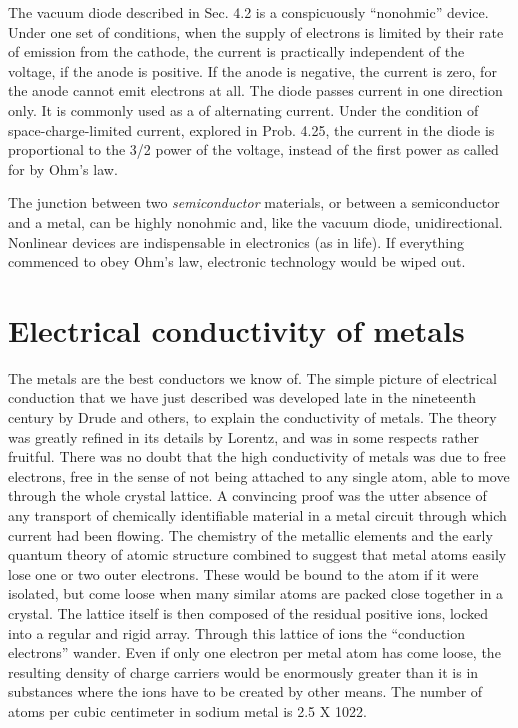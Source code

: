 The vacuum diode described in Sec. 4.2 is a conspicuously ``nonohmic''
device. Under one set of conditions, when the supply of
electrons is limited by their rate of emission from the cathode, the
current is practically independent of the voltage, if the anode is positive.
If the anode is negative, the current is zero, for the anode cannot
emit electrons at all. The diode passes current in one direction
only. It is commonly used as a  of alternating current.
Under the condition of space-charge-limited current, explored in
Prob. 4.25, the current in the diode is proportional to the 3/2 power
of the voltage, instead of the first power as called for by Ohm's law.

The junction between two \emph{semiconductor} materials, or between a
semiconductor and a metal, can be highly nonohmic and, like the
vacuum diode, unidirectional. Nonlinear devices are indispensable
in electronics (as in life). If everything commenced to obey Ohm's
law, electronic technology would be wiped out.

\iffalse

\section{Electrical conductivity of metals}

The metals are the best conductors we know of. The simple picture
of electrical conduction that we have just described was developed
late in the nineteenth century by Drude and others, to explain
the conductivity of metals. The theory was greatly refined in its details
by Lorentz, and was in some respects rather fruitful. There
was no doubt that the high conductivity of metals was due to
free electrons, free in the sense of not being attached to any single
atom, able to move through the whole crystal lattice. A convincing
proof was the utter absence of any transport of chemically identifiable
material in a metal circuit through which current had been flowing.
The chemistry of the metallic elements and the early quantum theory
of atomic structure combined to suggest that metal atoms easily lose
one or two outer electrons. These would be bound to the atom if it
were isolated, but come loose when many similar atoms are packed
close together in a crystal. The lattice itself is then composed of the
residual positive ions, locked into a regular and rigid array. Through
this lattice of ions the ``conduction electrons'' wander. Even if only
one electron per metal atom has come loose, the resulting density of
charge carriers would be enormously greater than it is in substances
where the ions have to be created by other means. The number of
atoms per cubic centimeter in sodium metal is 2.5 X 1022.

